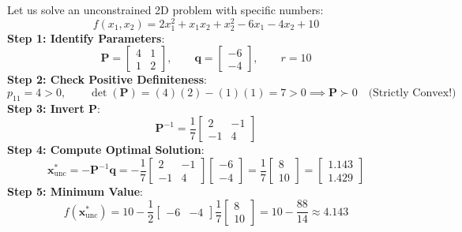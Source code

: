 \documentclass[11pt,a4paper]{article}
\begin{document}
\begin{examplebox}
Let us solve an unconstrained 2D problem with specific numbers:
\begin{equation*}
f(x_1, x_2) = 2 x_1^2 + x_1 x_2 + x_2^2 - 6 x_1 - 4 x_2 + 10
\end{equation*}
\textbf{Step 1: Identify Parameters}:
\begin{equation*}
\mathbf{P} = \begin{bmatrix} 4 & 1 \\ 1 & 2 \end{bmatrix}, \qquad
\mathbf{q} = \begin{bmatrix} -6 \\ -4 \end{bmatrix}, \qquad
r = 10
\end{equation*}
\textbf{Step 2: Check Positive Definiteness}:
\begin{equation*}
p_{11} = 4 > 0, \qquad \det(\mathbf{P}) = (4)(2) - (1)(1) = 7 > 0 \implies \mathbf{P} \succ 0 \quad \text{(Strictly Convex!)}
\end{equation*}
\textbf{Step 3: Invert $\mathbf{P}$}:
\begin{equation*}
\mathbf{P}^{-1} = \frac{1}{7} \begin{bmatrix} 2 & -1 \\ -1 & 4 \end{bmatrix}
\end{equation*}
\textbf{Step 4: Compute Optimal Solution}:
\begin{equation*}
\mathbf{x}^*_{\mathrm{unc}} = -\mathbf{P}^{-1} \mathbf{q} = -\frac{1}{7} \begin{bmatrix} 2 & -1 \\ -1 & 4 \end{bmatrix} \begin{bmatrix} -6 \\ -4 \end{bmatrix} = \frac{1}{7} \begin{bmatrix} 8 \\ 10 \end{bmatrix} = \begin{bmatrix} 1.143 \\ 1.429 \end{bmatrix}
\end{equation*}
\textbf{Step 5: Minimum Value}:
\begin{equation*}
f(\mathbf{x}^*_{\mathrm{unc}}) = 10 - \frac{1}{2} \begin{bmatrix} -6 & -4 \end{bmatrix} \frac{1}{7} \begin{bmatrix} 8 \\ 10 \end{bmatrix} = 10 - \frac{88}{14} \approx 4.143
\end{equation*}
\end{examplebox}
\end{document}
